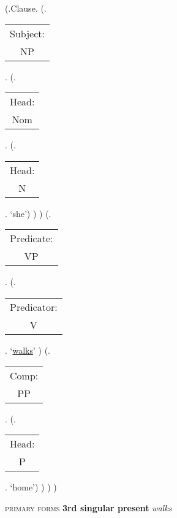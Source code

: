 \documentclass[12pt,letterpaper]{article}
\begin{document}
\begin{figure}
	\begin{center}
		\begin{parsetree}
			(.Clause.
			(.\begin{tabular}{c}Subject:\\NP\end{tabular}.  
			(.\begin{tabular}{c}Head:\\Nom\end{tabular}.
			(.\begin{tabular}{c}Head:\\N\end{tabular}. `she')
			)
			)
			(.\begin{tabular}{c}Predicate:\\VP\end{tabular}.
			(.\begin{tabular}{c}Predicator:\\V\end{tabular}.    `\underline{walks}' )
			(.\begin{tabular}{c}Comp:\\PP\end{tabular}. 
			(.\begin{tabular}{c}Head:\\P\end{tabular}. `home')
			)
			)
			)
			
		\end{parsetree}
		\hfill \break \hfill {} \textsc{primary forms} \textbf{3rd singular present} \textit{walks}
	\end{center}
\end{figure}
\end{document}
